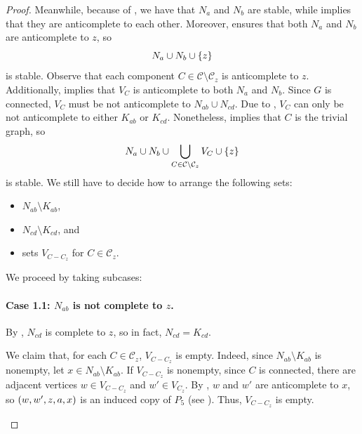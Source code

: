 \begin{proof}
    Meanwhile, because of , we have that $N_a$ and
    $N_b$ are stable, while  implies that they are
    anticomplete to each other. Moreover,  ensures that
    both $N_a$ and $N_b$ are anticomplete to $z$, so
    \[
        N_a \cup N_b \cup \left\{z\right\}
    \]
    is stable. Observe that each component $C\in \mathcal{C}\setminus
    \mathcal{C}_z$ is anticomplete to $z$. Additionally,
     implies that $V_C$ is anticomplete to both $N_a$
    and $N_b$.  Since $G$ is connected, $V_C$ must be not anticomplete to
    $N_{ab} \cup N_{cd}$. Due to , $V_C$ can only be
    not anticomplete to either $K_{ab}$ or $K_{cd}$. Nonetheless,
     implies that $C$ is the trivial graph, so
    \[
        N_a \cup N_b \cup \bigcup_{C\in\mathcal{C}\setminus \mathcal{C}_z} V_C 
        \cup \left\{z\right\}
    \]
    is stable. We still have to decide how to arrange the following sets:
    \begin{itemize}
        \item $N_{ab}\setminus K_{ab}$,
        \item $N_{cd}\setminus K_{cd}$, and
        \item sets $V_{C-C_z}$ for $C \in \mathcal{C}_z$.
    \end{itemize}
    We proceed by taking subcases:

    \paragraph{Case 1.1: $N_{ab}$ is not complete to $z$.} By
    , $N_{cd}$ is complete to $z$, so in fact, $N_{cd}
    = K_{cd}$. 
    
    We claim that, for each $C\in \mathcal{C}_z$, $V_{C-C_z}$ is empty. Indeed,
    since $N_{ab}\setminus K_{ab}$ is nonempty, let $x\in N_{ab}\setminus
    K_{ab}$. If $V_{C - C_z}$ is nonempty, since $C$ is connected, there are
    adjacent vertices $w\in V_{C - C_z}$ and $w'\in V_{C_z}$. By
    , $w$ and $w'$ are anticomplete to $x$, so
    $\left(w,w',z,a,x\right)$ is an induced copy of $P_5$ (see
    ). Thus, $V_{C-C_z}$ is empty.

    \begin{figure}[htb!]
        \centering
\end{figure}
\end{proof}
